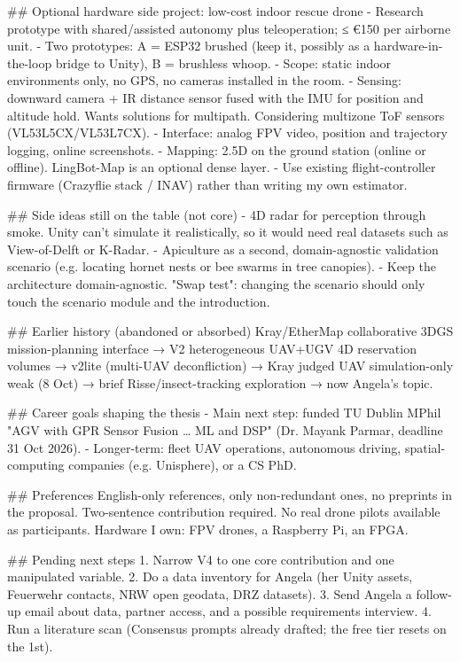 ## Optional hardware side project: low-cost indoor rescue drone
- Research prototype with shared/assisted autonomy plus teleoperation; ≤ €150 per airborne unit.
- Two prototypes: A = ESP32 brushed (keep it, possibly as a hardware-in-the-loop bridge to Unity),
  B = brushless whoop.
- Scope: static indoor environments only, no GPS, no cameras installed in the room.
- Sensing: downward camera + IR distance sensor fused with the IMU for position and altitude hold.
  Wants solutions for multipath. Considering multizone ToF sensors (VL53L5CX/VL53L7CX).
- Interface: analog FPV video, position and trajectory logging, online screenshots.
- Mapping: 2.5D on the ground station (online or offline). LingBot-Map is an optional dense layer.
- Use existing flight-controller firmware (Crazyflie stack / INAV) rather than writing my own estimator.

## Side ideas still on the table (not core)
- 4D radar for perception through smoke. Unity can't simulate it realistically,
  so it would need real datasets such as View-of-Delft or K-Radar.
- Apiculture as a second, domain-agnostic validation scenario
  (e.g. locating hornet nests or bee swarms in tree canopies).
- Keep the architecture domain-agnostic. "Swap test": changing the scenario should only touch
  the scenario module and the introduction.

## Earlier history (abandoned or absorbed)
Kray/EtherMap collaborative 3DGS mission-planning interface → V2 heterogeneous UAV+UGV 4D
reservation volumes → v2lite (multi-UAV deconfliction) → Kray judged UAV simulation-only weak
(8 Oct) → brief Risse/insect-tracking exploration → now Angela's topic.

## Career goals shaping the thesis
- Main next step: funded TU Dublin MPhil "AGV with GPR Sensor Fusion … ML and DSP"
  (Dr. Mayank Parmar, deadline 31 Oct 2026).
- Longer-term: fleet UAV operations, autonomous driving, spatial-computing companies (e.g. Unisphere),
  or a CS PhD.

## Preferences
English-only references, only non-redundant ones, no preprints in the proposal.
Two-sentence contribution required. No real drone pilots available as participants.
Hardware I own: FPV drones, a Raspberry Pi, an FPGA.

## Pending next steps
1. Narrow V4 to one core contribution and one manipulated variable.
2. Do a data inventory for Angela (her Unity assets, Feuerwehr contacts, NRW open geodata, DRZ datasets).
3. Send Angela a follow-up email about data, partner access, and a possible requirements interview.
4. Run a literature scan (Consensus prompts already drafted; the free tier resets on the 1st).